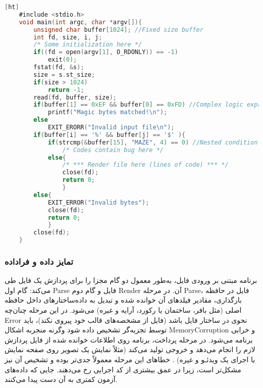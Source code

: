 \begin{LTR}
	\singlespacing
	\begin{lstlisting}[language=C, caption={\rl{یک قطعه‌کد به عنوان نمونه‌ای از نرم‌افزار تحت آزمون در این پایان‌نامه، با ساختار تودرتو که چالش‌های پیچیدگی برنامه تحت آزمون و پوشش کد در آزمون فازی قالب فایل را نشان می‌دهد \cite{Rawat2017VUzzerAE}(با تغییر).}}, label={codesnip1},lineskip=.05cm][ht]
	#include <stdio.h>
	void main(int argc, char *argv[]){
		unsigned char buffer[1024]; //Fixed size buffer
		int fd, size, i, j;
		/* Some initialization here */
		if((fd = open(argv[1], O_RDONLY)) == -1)
			exit(0);
		fstat(fd, &s);
		size = s.st_size;
		if(size > 1024)
			return -1;
		read(fd, buffer, size);
		if(buffer[1] == 0xEF && buffer[0] == 0xFD) //Complex logic expression
			printf("Magic bytes matched!\n");
		else
			EXIT_ERORR("Invalid input file\n");
		if(buffer[i] == '%' && buffer[j] == '$' ){
			if(strcmp(&buffer[15], "MAZE", 4) == 0) //Nested condition
				/* Codes contain bug here */
			else{
				/* *** Render file here (lines of code) *** */
				close(fd); 
				return 0;
				}
		else{
			EXIT_ERROR("Invalid bytes");
			close(fd);
			return 0;
			}
		close(fd);
	}\end{lstlisting}
	\doublespacing
\end{LTR}




\subsubsection{ تمایز داده و فراداده}
	برنامه مبتنی بر ورودی فایل، به‌طور معمول دو گام مجزا را برای پردازش یک فایل طی می‌کند: گام اول \gls{Parse} فایل و گام دوم \gls{Render} آن. در مرحله \gls{Parse}، فایل در حافظه بارگذاری، مقادیر فیلدهای آن خوانده شده و تبدیل به داده‌ساختارهای داخل حافظه اصلی (مثل بافر، ساختمان یا رکورد، آرایه و غیره) می‌شود. در این مرحله چنان‌چه \gls{Error} نحوی در ساختار فایل باشد (فایل از مشخصه‌های قالب خود پیروی نکند)، باید توسط تجزیه‌گر تشخیص داده شود وگرنه منجربه اشکال \gls{MemoryCorruption} و خرابی برنامه می‌شود. در مرحله پرداخت، برنامه روی اطلاعات خوانده شده از فایل پردازش لازم را انجام می‌دهد و خروجی تولید می‌کند (مثلاً نمایش یک تصویر روی صفحه نمایش یا اجرای یک ویدئـو و غیره) \cite{Rathaus:2007:OSF:1536880}. خطاهای این مرحله معمولاً جدی‌تر بوده و تشخیص آن نیز مشکل‌تر است، زیرا در عمق بیشتری از کد اجرایی رخ می‌دهند. جایی که داده‌های آزمون کمتری به آن دست پیدا می‌کنند.
	
